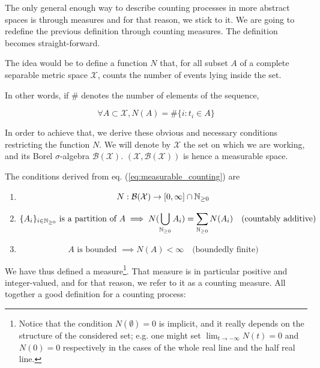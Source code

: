 \documentclass[11pt]{book}
\newcommand{\sequence}[1]{\{ #1 \}_{ i \in \N} }
\begin{document}
The only general enough way to describe counting processes in more abstract spaces is through measures and for that reason, we stick to it. We are going to redefine the previous definition through counting measures. The definition becomes straight-forward.

The idea would be to define a function $N$ that, for all subset $A$ of a complete separable metric space $\mathcal X$, counts the number of events lying inside the set.

In other words, if $\#$ denotes the number of elements of the sequence,

\begin{equation}
\forall A \subset \mathcal X, N(A) = \# \{ i: t_i \in A \}
\label{eq:measurable_counting}
\end{equation}

In order to achieve that, we derive these obvious and necessary conditions restricting the function $N$. We will denote by $\mathcal X$ the set on which we are working, and its Borel $\sigma$-algebra $\mathcal B( \mathcal X )$. $( \mathcal X, \mathcal B( \mathcal X ) )$ is hence a measurable space.

The conditions derived from eq. (\ref{eq:measurable_counting}) are
\begin{enumerate}
\setlength{\itemindent}{1 cm}
\item  
\begin{equation}
N : \mathcal B( \mathcal X ) \to [0, \infty ] \cap \mathbb{N}_{\geq 0}
\end{equation}
\item 
\begin{equation}
\sequence{A_i} \text{ is a partition of } A \implies N( \bigcup_{\N} A_i ) = \sum_{\N} N(A_i)  \quad \text{(countably additive)}
\end{equation}
\item 
\begin{equation}
A \text{ is bounded } \implies N(A) < \infty  \quad \text{(boundedly finite)}
\end{equation}
\end{enumerate}

We have thus defined a measure\footnote{Notice that the condition $N( \emptyset ) = 0$ is implicit, and it really depends on the structure of the considered set; e.g. one might set $\lim_{t\to -\infty} N(t) = 0$ and $N(0) = 0$ respectively in the cases of the whole real line and the half real line.}. That measure is in particular positive and integer-valued, and for that reason, we refer to it as a counting measure. All together a good definition for a counting process:
\end{document}
